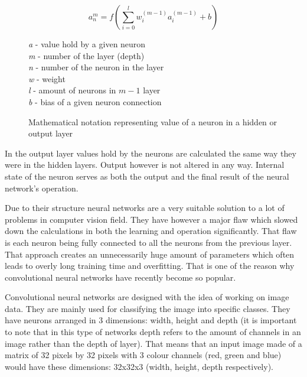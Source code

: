 \documentclass{ijisa}
\begin{document}
\begin{figure}[!h]
\centering
\[ a_n^m = f(\sum_{i=0}^{l} w_i^{(m-1)} a_i^{(m-1)} + b)\]

\textit{a} - value hold by a given neuron\\
\textit{m} - number of the layer (depth)\\
\textit{n} - number of the neuron in the layer\\
\textit{w} - weight\\
\textit{l} - amount of neurons in \(m-1\) layer\\
\textit{b} - bias of a given neuron connection

%
\caption{Mathematical notation representing value of a neuron in a hidden or output layer}
\end{figure}

In the output layer values hold by the neurons are calculated the same way they were in the hidden layers. Output however is not altered in any way. Internal state of the neuron serves as both the output and the final result of the neural network's operation. 

Due to their structure neural networks are a very suitable solution to a lot of problems in computer vision field. They have however a major flaw which slowed down the calculations in both the learning and operation significantly. That flaw is each neuron being fully connected to all the neurons from the previous layer. That approach creates an unnecessarily huge amount of parameters which often leads to overly long training time and overfitting. That is one of the reason why convolutional neural networks have recently become so popular. 

Convolutional neural networks are designed with the idea of working on image data. They are mainly used for classifying the image into specific classes. They have neurons arranged in 3 dimensions: width, height and depth (it is important to note that in this type of networks depth refers to the amount of channels in an image rather than the depth of layer). That means that an input image made of a matrix of 32 pixels by 32 pixels with 3 colour channels (red, green and blue) would have these dimensions: 32x32x3 (width, height, depth respectively). 
\end{document}
